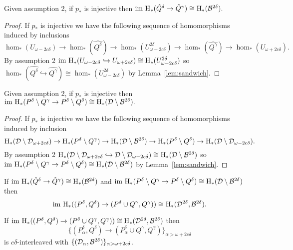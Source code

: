 \begin{lemma}
    Given assumption 2, if $p_*$ is injective then $\mathrm{im}~\mathrm{H}_*(\hat{Q}^\delta \to \hat{Q}^{\gamma})\cong \mathrm{H}_*({\mathcal{B}}^{2\delta}).$
\end{lemma}
\begin{proof}
    If $p_*$ is injective we have the following sequence of homomorphisms induced by inclusions
    \[ \hom_*(U_{\omega - 2c\delta})\to \hom_*(\hat{Q^\delta})\to \hom_*(U_{\omega - 2c\delta}^{2\delta})\to\hom_*(\hat{Q^\gamma})\to\hom_*(U_{\omega + 2c\delta}).\]
    By assumption 2 $\mathrm{im}~\mathrm{H}_*(U_{\omega - 2c\delta}\hookrightarrow U_{\omega+2c\delta})\cong\mathrm{H}_*(U_{\omega-2c\delta}^{2\delta})$ so $\hom_*(\hat{Q^\delta}\hookrightarrow\hat{Q^\gamma})\cong\hom_*(U_{\omega-2c\delta}^{2\delta})$ by Lemma~\ref{lem:sandwich}.
\end{proof}

\begin{lemma}
    Given assumption 2, if $p_*$ is injective then $\mathrm{im}~\mathrm{H}_*(P^\delta\setminus Q^\gamma \to P^\delta\setminus Q^\delta)\cong \mathrm{H}_*({\mathcal{D}}\setminus{\mathcal{B}}^{2\delta}).$
\end{lemma}
\begin{proof}
    If $p_*$ is injective we have the following sequence of homomorphisms induced by inclusion
    \[\mathrm{H}_*({\mathcal{D}}\setminus{\mathcal{D}}_{\omega+2c\delta})\to\mathrm{H}_*(P^\delta\setminus Q^\gamma)\to\mathrm{H}_*({\mathcal{D}}\setminus{\mathcal{B}}^{2\delta})\to\mathrm{H}_*(P^\delta\setminus Q^\delta)\to\mathrm{H}_*({\mathcal{D}}\setminus{\mathcal{D}}_{\omega-2c\delta}).\]
    By assumption 2 $\mathrm{H}_*({\mathcal{D}}\setminus{\mathcal{D}}_{\omega+2c\delta}\hookrightarrow {\mathcal{D}}\setminus{\mathcal{D}}_{\omega-2c\delta})\cong\mathrm{H}_*({\mathcal{D}}\setminus{\mathcal{B}}^{2\delta})$ so $\mathrm{im}~\mathrm{H}_*(P^\delta\setminus Q^\gamma \to P^\delta\setminus Q^\delta)\cong \mathrm{H}_*({\mathcal{D}}\setminus{\mathcal{B}}^{2\delta})$ by Lemma~\ref{lem:sandwich}.
\end{proof}


\begin{lemma}
    If $\mathrm{im}~\mathrm{H}_*(\hat{Q}^\delta\to\hat{Q}^\gamma)\cong\mathrm{H}_*({\mathcal{B}}^{2\delta})$ and $\mathrm{im}~\mathrm{H}_*(P^\delta\setminus Q^\gamma \to P^\delta\setminus Q^\delta)\cong \mathrm{H}_*({\mathcal{D}}\setminus{\mathcal{B}}^{2\delta})$ then
    \[\mathrm{im}~\mathrm{H}_*((P^\delta, Q^\delta)\to (P^\delta\cup Q^\gamma, Q^\gamma))\cong \mathrm{H}_*({\mathcal{D}}^{2\delta}, {\mathcal{B}}^{2\delta}). \]
\end{lemma}

\begin{theorem}
    If $\mathrm{im}~\mathrm{H}_*((P^\delta, Q^\delta)\to (P^\delta\cup Q^\gamma, Q^\gamma))\cong \mathrm{H}_*({\mathcal{D}}^{2\delta}, {\mathcal{B}}^{2\delta})$ then \[\{(P_\alpha^\delta, Q^\delta)\to (P_\alpha^\delta\cup Q^\gamma, Q^\gamma)\}_{\alpha > \omega+2c\delta}\] is $c\delta$-interleaved with $\{({\mathcal{D}}_\alpha, {\mathcal{B}}^{2\delta})\}_{\alpha > \omega +2c\delta}$.
\end{theorem}

